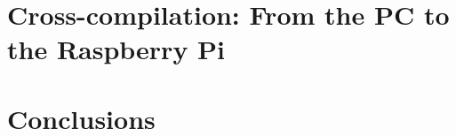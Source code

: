 \documentclass[electronics,article,submit,moreauthors,pdftex,10pt,a4paper]{mdpi}
\theoremstyle{mdpi}
\newcounter{ex}
\newcounter{re}
\theoremstyle{mdpidefinition}
\begin{document}
\section{Cross-compilation: From the PC to the Raspberry Pi}


\section{Conclusions}


\appendix








\end{document}
